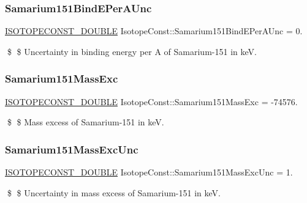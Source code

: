 \subsubsection{\texorpdfstring{Samarium151\+Bind\+E\+Per\+A\+Unc}{Samarium151BindEPerAUnc}}
{\footnotesize\ttfamily \mbox{\hyperlink{group___isotope_const-_macros_ga8f45a7272ce02c0b4c65c44636ed719a}{I\+S\+O\+T\+O\+P\+E\+C\+O\+N\+S\+T\+\_\+\+D\+O\+U\+B\+LE}} Isotope\+Const\+::\+Samarium151\+Bind\+E\+Per\+A\+Unc = 0.}

\$ \$ Uncertainty in binding energy per A of Samarium-\/151 in keV. \mbox{\label{group___isotope_const-_samarium-_sm151_ga2d5f17397b3a7ed2119091b060ae9890}} 
\subsubsection{\texorpdfstring{Samarium151\+Mass\+Exc}{Samarium151MassExc}}
{\footnotesize\ttfamily \mbox{\hyperlink{group___isotope_const-_macros_ga8f45a7272ce02c0b4c65c44636ed719a}{I\+S\+O\+T\+O\+P\+E\+C\+O\+N\+S\+T\+\_\+\+D\+O\+U\+B\+LE}} Isotope\+Const\+::\+Samarium151\+Mass\+Exc = -\/74576.}

\$ \$ Mass excess of Samarium-\/151 in keV. \mbox{\label{group___isotope_const-_samarium-_sm151_gab92e7b7fa8eebc848d777293d10fff35}} 
\subsubsection{\texorpdfstring{Samarium151\+Mass\+Exc\+Unc}{Samarium151MassExcUnc}}
{\footnotesize\ttfamily \mbox{\hyperlink{group___isotope_const-_macros_ga8f45a7272ce02c0b4c65c44636ed719a}{I\+S\+O\+T\+O\+P\+E\+C\+O\+N\+S\+T\+\_\+\+D\+O\+U\+B\+LE}} Isotope\+Const\+::\+Samarium151\+Mass\+Exc\+Unc = 1.}

\$ \$ Uncertainty in mass excess of Samarium-\/151 in keV. \mbox{\label{group___isotope_const-_samarium-_sm151_gafc863df156bb9fdeb77867c000237894}} 
